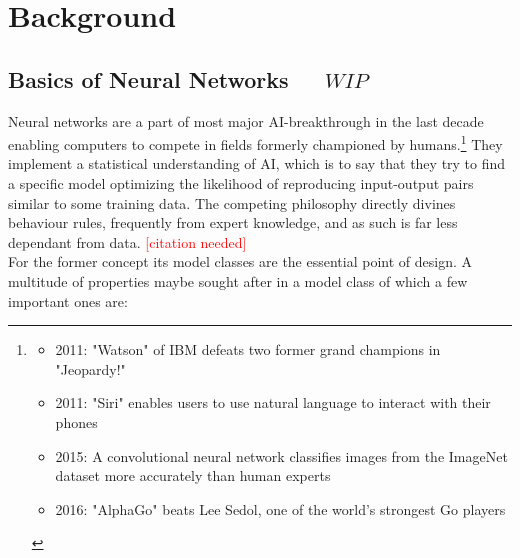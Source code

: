 \chapter{Background}
\label{ch:background}


\section{Basics of Neural Networks\ \ \  \(WIP\)}
Neural networks are a part of most major AI-breakthrough in the last decade enabling computers to compete in fields formerly championed by humans.\footnote{
	\begin{itemize}
		\item 
			2011: "Watson" of IBM defeats two former grand champions in "Jeopardy!" \cite{lally2011natural}
		\item 
			2011: "Siri" enables users to use natural language to interact with their phones 
			\cite{ARON201124}
		\item 
			2015: A convolutional neural network classifies images from the ImageNet dataset more accurately than human experts 
			\cite{Russakovsky2015} \cite{He_2015_ICCV}
		\item 
			2016: "AlphaGo" beats Lee Sedol, one of the world's strongest Go players
			\cite{gibney2016google} \cite{silver2017mastering}
	\end{itemize}
}
They implement a statistical understanding of AI, which is to say that they try to find a specific model optimizing the likelihood of reproducing input-output pairs similar to some training data. The competing philosophy directly divines behaviour rules, frequently from expert knowledge, and as such is far less dependant from data.  
\textcolor{red}{[citation needed]}\\
For the former concept its model classes are the essential point of design. A multitude of properties maybe sought after in a model class of which a few important ones are:
